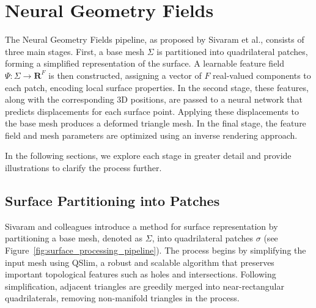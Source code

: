 \section{Neural Geometry Fields}\label{Sec:MainPart}

The Neural Geometry Fields pipeline, as proposed by Sivaram et al., consists of three main stages.  
First, a base mesh $\Sigma$ is partitioned into quadrilateral patches, forming a simplified representation of the surface.  
A learnable feature field $\Psi: \Sigma \rightarrow \mathbf{R}^F$ is then constructed, assigning a vector of $F$ real-valued components to each patch, encoding local surface properties.  
In the second stage, these features, along with the corresponding 3D positions, are passed to a neural network that predicts displacements for each surface point.  
Applying these displacements to the base mesh produces a deformed triangle mesh.  
In the final stage, the feature field and mesh parameters are optimized using an inverse rendering approach.  

In the following sections, we explore each stage in greater detail and provide illustrations to clarify the process further.

\subsection{Surface Partitioning into Patches}

Sivaram and colleagues introduce a method for surface representation by partitioning a base mesh, denoted as $\Sigma$, into quadrilateral patches $\sigma$ (see Figure~\ref{fig:surface_processing_pipeline}).  
The process begins by simplifying the input mesh using QSlim, a robust and scalable algorithm that preserves important topological features such as holes and intersections.  
Following simplification, adjacent triangles are greedily merged into near-rectangular quadrilaterals, removing non-manifold triangles in the process.  

